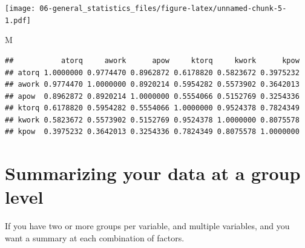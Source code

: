 \documentclass[
]{book}
\newenvironment{Shaded}{\begin{snugshade}}{\end{snugshade}}
\newcommand{\CommentTok}[1]{\textcolor[rgb]{0.56,0.35,0.01}{\textit{#1}}}
\newcommand{\DataTypeTok}[1]{\textcolor[rgb]{0.13,0.29,0.53}{#1}}
\newcommand{\FloatTok}[1]{\textcolor[rgb]{0.00,0.00,0.81}{#1}}
\newcommand{\KeywordTok}[1]{\textcolor[rgb]{0.13,0.29,0.53}{\textbf{#1}}}
\newcommand{\NormalTok}[1]{#1}
\newcommand{\OperatorTok}[1]{\textcolor[rgb]{0.81,0.36,0.00}{\textbf{#1}}}
\newcommand{\StringTok}[1]{\textcolor[rgb]{0.31,0.60,0.02}{#1}}
\begin{document}
\texttt{[image: 06-general\_statistics\_files/figure-latex/unnamed-chunk-5-1.pdf]}

\begin{Shaded}
\begin{Highlighting}[]
\NormalTok{M}
\end{Highlighting}
\end{Shaded}

\begin{verbatim}
##           atorq     awork      apow     ktorq     kwork      kpow
## atorq 1.0000000 0.9774470 0.8962872 0.6178820 0.5823672 0.3975232
## awork 0.9774470 1.0000000 0.8920214 0.5954282 0.5573902 0.3642013
## apow  0.8962872 0.8920214 1.0000000 0.5554066 0.5152769 0.3254336
## ktorq 0.6178820 0.5954282 0.5554066 1.0000000 0.9524378 0.7824349
## kwork 0.5823672 0.5573902 0.5152769 0.9524378 1.0000000 0.8075578
## kpow  0.3975232 0.3642013 0.3254336 0.7824349 0.8075578 1.0000000
\end{verbatim}

\hypertarget{summarizing-your-data-at-a-group-level}{%
\section{Summarizing your data at a group level}\label{summarizing-your-data-at-a-group-level}}

If you have two or more groups per variable, and multiple variables, and you want a summary at each combination of factors.

\begin{Shaded}
\end{Shaded}
\end{document}
